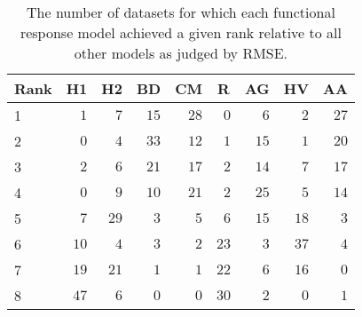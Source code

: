 \begin{table}[!tbp]
\caption{The number of datasets for which each functional response model achieved a given rank relative to all other models as judged by RMSE.\label{table:RMSE_rankings}} 
\begin{center}
\begin{tabular}{lrrrrrrrr}
\hline\hline
\multicolumn{1}{l}{Rank}&\multicolumn{1}{c}{H1}&\multicolumn{1}{c}{H2}&\multicolumn{1}{c}{BD}&\multicolumn{1}{c}{CM}&\multicolumn{1}{c}{R}&\multicolumn{1}{c}{AG}&\multicolumn{1}{c}{HV}&\multicolumn{1}{c}{AA}\tabularnewline
\hline
1&$ 1$&$ 7$&$15$&$28$&$ 0$&$ 6$&$ 2$&$27$\tabularnewline
2&$ 0$&$ 4$&$33$&$12$&$ 1$&$15$&$ 1$&$20$\tabularnewline
3&$ 2$&$ 6$&$21$&$17$&$ 2$&$14$&$ 7$&$17$\tabularnewline
4&$ 0$&$ 9$&$10$&$21$&$ 2$&$25$&$ 5$&$14$\tabularnewline
5&$ 7$&$29$&$ 3$&$ 5$&$ 6$&$15$&$18$&$ 3$\tabularnewline
6&$10$&$ 4$&$ 3$&$ 2$&$23$&$ 3$&$37$&$ 4$\tabularnewline
7&$19$&$21$&$ 1$&$ 1$&$22$&$ 6$&$16$&$ 0$\tabularnewline
8&$47$&$ 6$&$ 0$&$ 0$&$30$&$ 2$&$ 0$&$ 1$\tabularnewline
\hline
\end{tabular}\end{center}
\end{table}

